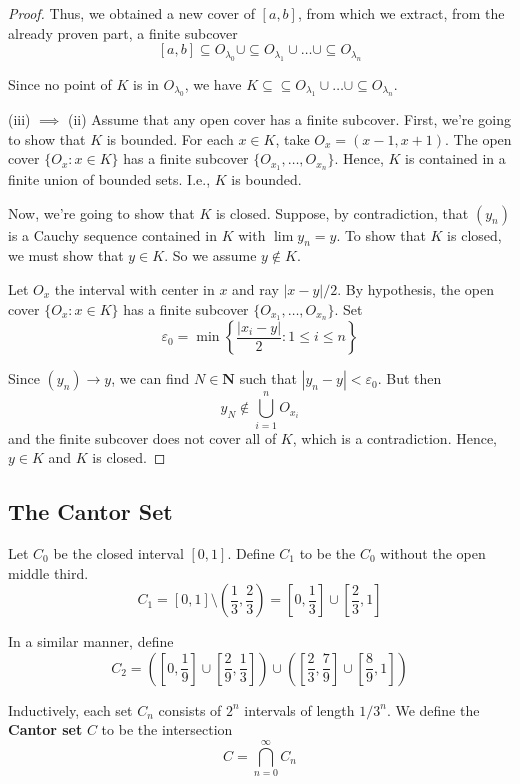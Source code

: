 \documentclass[tikz,12pt,a4paper]{article}
\theoremstyle{definition}
\begin{document}
\begin{proof}
	Thus, we obtained a new cover of $[a,b]$, from which we extract, from the already proven part, a finite subcover
	\[
		[a,b] \subseteq O_{\lambda_0} \cup \subseteq O_{\lambda_1} \cup \ldots \cup \subseteq O_{\lambda_n}
	\]
	
	Since no point of $K$ is in $O_{\lambda_0}$, we have $K \subseteq \subseteq O_{\lambda_1} \cup \ldots \cup \subseteq O_{\lambda_n}$.
	
	(iii) $\implies$ (ii) Assume that any open cover has a finite subcover. First, we're going to show that $K$ is bounded. For each $x \in K$, take $O_x = (x-1, x+1)$. The open cover $\{O_x : x \in K\}$ has a finite subcover $\{ O_{x_1}, \ldots, O_{x_n} \}$. Hence, $K$ is contained in a finite union of bounded sets. I.e., $K$ is bounded.
	
	Now, we're going to show that $K$ is closed. Suppose, by contradiction, that $(y_n)$ is a Cauchy sequence contained in $K$ with $\lim y_n = y$. To show that $K$ is closed, we must show that $y \in K$. So we assume $y \notin K$.
	
	Let $O_x$ the interval with center in $x$ and ray $|x-y|/2$. By hypothesis, the open cover $\{O_x : x \in K\}$ has a finite subcover $\{ O_{x_1}, \ldots, O_{x_n} \}$. Set
	\[
		\varepsilon_0 = \min \left\{ \frac{|x_i - y|}{2} : 1 \leq i \leq n \right\}
	\]
	
	Since $(y_n) \to y$, we can find $N \in \textbf{N}$ such that $|y_n - y| < \varepsilon_0$. But then 
	\[
		y_N \notin \bigcup_{i=1}^n O_{x_i} 
	\]
	and the finite subcover does not cover all of $K$, which is a contradiction. Hence, $y \in K$ and $K$ is closed.
\end{proof}

\subsection{The Cantor Set}

Let $C_0$ be the closed interval $[0,1]$. Define $C_1$ to be the $C_0$ without the open middle third.
\[
	C_1 = [0,1] \setminus \left( \frac{1}{3}, \frac{2}{3} \right) = \left[0, \frac{1}{3} \right] \cup \left[\frac{2}{3}, 1 \right]
\]

In a similar manner, define
\[
	C_2 = \left(  \left[0, \frac{1}{9} \right] \cup  \left[\frac{2}{9}, \frac{1}{3} \right] \right) \cup   \left(  \left[\frac{2}{3}, \frac{7}{9} \right] \cup  \left[\frac{8}{9}, 1 \right] \right)
\]

Inductively, each set $C_n$ consists of $2^n$ intervals of length $1/3^n$. We define the \textbf{Cantor set} $C$ to be the intersection
\[
	C = \bigcap_{n=0}^\infty C_n
\]
\end{document}
